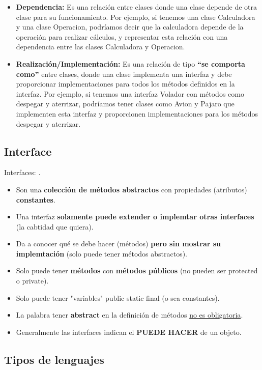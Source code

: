 \documentclass[../main.tex]{subfiles}
\begin{document}
\begin{itemize}
            \item \textbf{Dependencia:} Es una relación entre clases donde una clase depende de otra clase para su funcionamiento. Por ejemplo, si tenemos una clase Calculadora y una clase Operacion, podríamos decir que la calculadora depende de la operación para realizar cálculos, y representar esta relación con una dependencia entre las clases Calculadora y Operacion.
            \item \textbf{Realización/Implementación:} Es una relación de tipo \textbf{“se comporta como”} entre clases, donde una clase implementa una interfaz y debe proporcionar implementaciones para todos los métodos definidos en la interfaz. Por ejemplo, si tenemos una interfaz Volador con métodos como despegar y aterrizar, podríamos tener clases como Avion y Pajaro que implementen esta interfaz y proporcionen implementaciones para los métodos despegar y aterrizar.
        \end{itemize}
        
    \subsection{Interface}
        Interfaces: \cite{interfaces}.
        \begin{itemize}
            \item Son una \textbf{colección de métodos abstractos} con propiedades (atributos) \textbf{constantes}.
            \item Una interfaz \textbf{solamente puede extender o implemtar otras interfaces} (la cabtidad que quiera).
            \item Da a conocer qué se debe hacer (métodos) \textbf{pero sin mostrar su implemtación} (solo puede tener métodos abstractos).
            \item Solo puede tener \textbf{métodos} con \textbf{métodos públicos} (no pueden ser protected o private).
            \item Solo puede tener "variables" public static final (o sea constantes).
            \item La palabra tener \textbf{abstract} en la definición de métodos \underline{no es obligatoria}.
            \item Generalmente las interfaces indican el \textbf{PUEDE HACER} de un objeto.
        \end{itemize}



    \subsection{Tipos de lenguajes}
        
\end{document}
